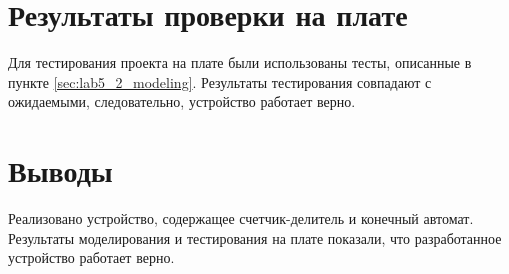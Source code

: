 \section{Результаты проверки на плате}

Для тестирования проекта на плате были использованы тесты, описанные в пункте \ref{sec:lab5_2_modeling}. Результаты тестирования совпадают с ожидаемыми, следовательно, устройство работает верно.

\section{Выводы}

Реализовано устройство, содержащее счетчик-делитель и конечный автомат. Результаты моделирования и тестирования на плате показали, что разработанное устройство работает верно.

